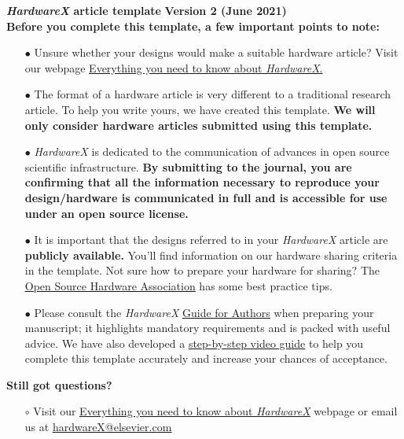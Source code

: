 \documentclass[11pt, letterpaper]{article}
\begin{document}
\begin{flushleft}

{\Huge \bf {\it HardwareX} article template} \textbf{Version 2 (June 2021)}\\
\vskip 0.5cm
{\bf Before you complete this template, a few important points to note:}

\begin{itemize}
\item[$\bullet$]Unsure whether your designs would make a suitable hardware article? Visit our webpage \href{https://www.journals.elsevier.com/hardwarex/submit-your-hardware/everything-you-need-to-know-about-hardwarex}{\underline{Everything you need to know about {\it HardwareX}}.}
\item[$\bullet$]The format of a hardware article is very different to a traditional research article. To help you write yours, we have created this template. {\bf We will only consider hardware articles submitted using this template.}
\item[$\bullet$]{\it HardwareX} is dedicated to the communication of advances in open source scientific infrastructure. {\bf By submitting to the journal, you are confirming that all the information necessary to reproduce your design/hardware is communicated in full and is accessible for use under an open source license.} 
\item[$\bullet$]It is important that the designs referred to in your {\it HardwareX} article are {\bf publicly available.} You’ll find information on our hardware sharing criteria in the template. Not sure how to prepare your hardware for sharing? The \href{https://www.oshwa.org/sharing-best-practices/}{\underline{Open Source Hardware Association}} has some best practice tips. 
\item[$\bullet$]Please consult the {\it HardwareX} \href{https://www.elsevier.com/journals/hardwarex/2468-0672/guide-for-authors}{\underline{Guide for Authors}} when preparing your manuscript; it highlights mandatory requirements and is packed with useful advice. We have also developed a \href{https://www.journals.elsevier.com/hardwarex/submit-your-hardware/how-to-submit-your-scientific-hardware-article-to-hardwarex}{\underline{step-by-step video guide}} to help you complete this template accurately and increase your chances of acceptance.
\end{itemize} 
{\bf Still got questions?}\\
\begin{itemize}
\item[$\circ$] Visit our \href{https://www.journals.elsevier.com/hardwarex/submit-your-hardware/everything-you-need-to-know-about-hardwarex}{\underline{Everything you need to know about {\it HardwareX}}} webpage or email us at \href{mailto:hardwareX@elsevier.com}{\underline{hardwareX@elsevier.com}}
\end{itemize} 


\end{flushleft}
\end{document}
